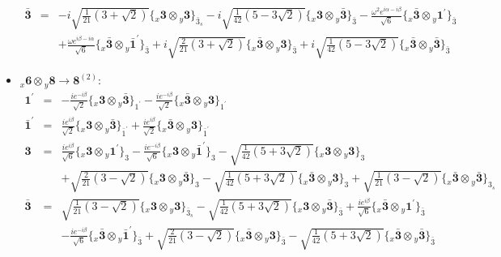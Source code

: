 \documentclass[english]{article}
\newcommand{\rep}[1]{\mathbf{#1}}
\newcommand{\repx}[2]{{}_{#2}\mathbf{#1}}
\newcommand{\subcg}[3]{\big\{ \repx{#1}{x}\otimes\repx{#2}{y}\big\}^{}_{#3}}
\begin{document}
\begin{itemize}
\begin{eqnarray*}
\rep{\bar{3}} &=& -i \sqrt{\frac{1}{21} \left(3+\sqrt{2}\right)}\subcg{3}{3}{\bar{3}_{s}}-i \sqrt{\frac{1}{42} \left(5-3 \sqrt{2}\right)}\subcg{3}{\bar{3}}{\bar{3}}-\frac{\omega ^2 e^{i \alpha -i \beta }}{\sqrt{6}}\subcg{\bar{3}}{1^{\prime}}{\bar{3}} \\ 
 & & +\frac{\omega  e^{i \beta -i \alpha }}{\sqrt{6}}\subcg{\bar{3}}{\bar{1}^{\prime}}{\bar{3}}+i \sqrt{\frac{2}{21} \left(3+\sqrt{2}\right)}\subcg{\bar{3}}{3}{\bar{3}}+i \sqrt{\frac{1}{42} \left(5-3 \sqrt{2}\right)}\subcg{\bar{3}}{\bar{3}}{\bar{3}}
\end{eqnarray*}
\item $\repx{6}{x}\otimes\repx{8}{y}\to\rep{8}^{(2)}$:
\begin{eqnarray*}
\rep{1^{\prime}} &=& -\frac{i e^{-i \beta }}{\sqrt{2}}\subcg{3}{\bar{3}}{1^{\prime}}-\frac{i e^{-i \beta }}{\sqrt{2}}\subcg{\bar{3}}{3}{1^{\prime}}
\\
\rep{\bar{1}^{\prime}} &=& \frac{i e^{i \beta }}{\sqrt{2}}\subcg{3}{\bar{3}}{\bar{1}^{\prime}}+\frac{i e^{i \beta }}{\sqrt{2}}\subcg{\bar{3}}{3}{\bar{1}^{\prime}}
\\
\rep{3} &=& \frac{i e^{i \beta }}{\sqrt{6}}\subcg{3}{1^{\prime}}{3}-\frac{i e^{-i \beta }}{\sqrt{6}}\subcg{3}{\bar{1}^{\prime}}{3}-\sqrt{\frac{1}{42} \left(5+3 \sqrt{2}\right)}\subcg{3}{3}{3} \\ 
 & & +\sqrt{\frac{2}{21} \left(3-\sqrt{2}\right)}\subcg{3}{\bar{3}}{3}-\sqrt{\frac{1}{42} \left(5+3 \sqrt{2}\right)}\subcg{\bar{3}}{3}{3}+\sqrt{\frac{1}{21} \left(3-\sqrt{2}\right)}\subcg{\bar{3}}{\bar{3}}{3_{s}}
\\
\rep{\bar{3}} &=& \sqrt{\frac{1}{21} \left(3-\sqrt{2}\right)}\subcg{3}{3}{\bar{3}_{s}}-\sqrt{\frac{1}{42} \left(5+3 \sqrt{2}\right)}\subcg{3}{\bar{3}}{\bar{3}}+\frac{i e^{i \beta }}{\sqrt{6}}\subcg{\bar{3}}{1^{\prime}}{\bar{3}} \\ 
 & & -\frac{i e^{-i \beta }}{\sqrt{6}}\subcg{\bar{3}}{\bar{1}^{\prime}}{\bar{3}}+\sqrt{\frac{2}{21} \left(3-\sqrt{2}\right)}\subcg{\bar{3}}{3}{\bar{3}}-\sqrt{\frac{1}{42} \left(5+3 \sqrt{2}\right)}\subcg{\bar{3}}{\bar{3}}{\bar{3}}
\end{eqnarray*}
\end{itemize}
\end{document}
